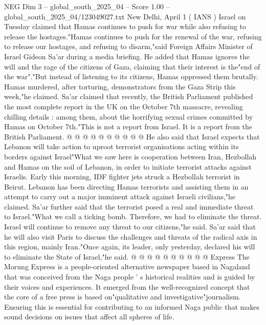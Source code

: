 \begin{textsample}{NEG Dim 3 – global\_south\_2025\_04 – Score 1.00 – global\_south\_2025\_04/123049027.txt}  \label{ex:f3_neg_346}
New Delhi, April 1 ( IANS ) Israel on Tuesday claimed that Hamas continues to push for war while also refusing to release the hostages."Hamas continues to push for the renewal of the war, refusing to release our hostages, and refusing to disarm,"said Foreign Affairs Minister of Israel Gideon Sa'ar during a media briefing.
He added that Hamas ignores the will and the rage of the citizens of Gaza, claiming that their interest is the"end of the war"."But instead of listening to its citizens, Hamas oppressed them brutally.
Hamas murdered, after torturing, demonstrators from the Gaza Strip this week,"he claimed.
Sa'ar claimed that recently, the British Parliament published the most complete report in the UK on the October 7th massacre, revealing chilling details : among them, about the horrifying sexual crimes committed by Hamas on October 7th."This is not a report from Israel.
It is a report from the British Parliament. @ @ @ @ @ @ @ @ @ @ He also said that Israel expects that Lebanon will take action to uproot terrorist organisations acting within its borders against Israel"What we saw here is cooperation between Iran, Hezbollah and Hamas on the soil of Lebanon, in order to initiate terrorist attacks against Israelis.
Early this morning, IDF fighter jets struck a Hezbollah terrorist in Beirut.
Lebanon has been directing Hamas terrorists and assisting them in an attempt to carry out a major imminent attack against Israeli civilians,"he claimed.
Sa'ar further said that the terrorist posed a real and immediate threat to Israel."What we call a ticking bomb.
Therefore, we had to eliminate the threat.
Israel will continue to remove any threat to our citizens,"he said.
Sa'ar said that he will also visit Paris to discuss the challenges and threats of the radical axis in this region, mainly Iran."Once again, its leader, only yesterday, declared his will to eliminate the State of Israel,"he said. @ @ @ @ @ @ @ @ @ @ Express The Morung Express is a people-oriented alternative newspaper based in Nagaland that was conceived from the Naga people ' s historical realities and is guided by their voices and experiences.
It emerged from the well-recognized concept that the core of a free press is based on"qualitative and investigative"journalism.
Ensuring this is essential for contributing to an informed Naga public that makes sound decisions on issues that affect all spheres of life.

\end{textsample}
